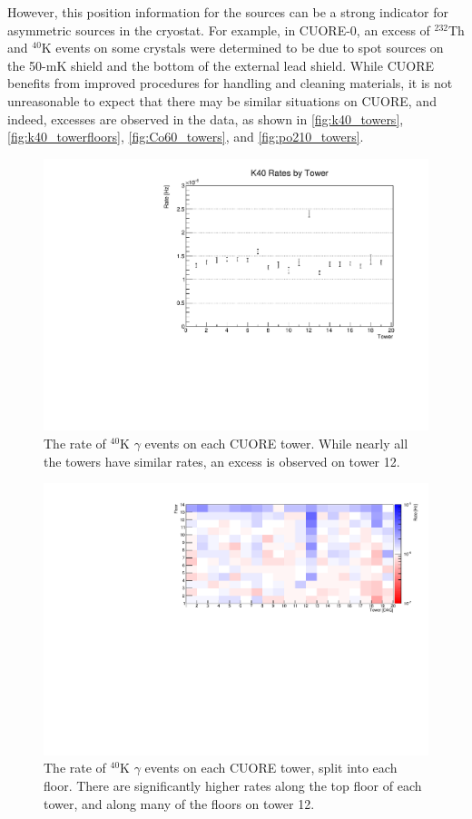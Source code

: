 However, this position information for the sources can be a strong indicator for asymmetric sources in the cryostat.
For example, in CUORE-0, an excess of $^{232}$Th and $^{40}$K events on some crystals were determined to be due to spot sources on the 50-mK shield and the bottom of the external lead shield.
While CUORE benefits from improved procedures for handling and cleaning materials, it is not unreasonable to expect that there may be similar situations on CUORE, and indeed, excesses are observed in the data, as shown in \autoref{fig:k40_towers}, \autoref{fig:k40_towerfloors}, \autoref{fig:Co60_towers}, and \autoref{fig:po210_towers}.

\begin{figure}
    \centering
    \includegraphics[width=0.8\linewidth]{Figures/K40AllTowers.pdf}
    \caption[The rate of $^{40}$K $\gamma$ events on each CUORE tower.]
    {The rate of $^{40}$K $\gamma$ events on each CUORE tower.
    While nearly all the towers have similar rates, an excess is observed on tower 12.}
    \label{fig:k40_towers}
\end{figure}

\begin{figure}
    \centering
    \includegraphics[width=0.9\linewidth]{Figures/K40TowerFloor.pdf}
    \caption[The rate of $^{40}$K $\gamma$ events on each CUORE tower, split into each floor.]
    {The rate of $^{40}$K $\gamma$ events on each CUORE tower, split into each floor.
    There are significantly higher rates along the top floor of each tower, and along many of the floors on tower 12.}
    \label{fig:k40_towerfloors}
\end{figure}

